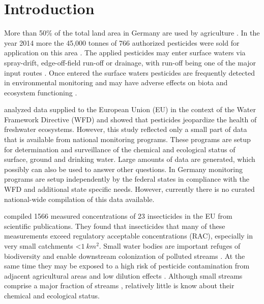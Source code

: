 \documentclass[journal=esthag,manuscript=article]{achemso}
\begin{document}
\section{Introduction}

More than 50\% of the total land area in Germany are used by agriculture \citep{statistisches_bundesamt_bodenflache_2014}.
In the year 2014 more the 45,000 tonnes of 766 authorized pesticides were sold for application on this area \citep{bundesamt_fur_verbraucherschutz_und_lebensmittelsicherheit_absatz_2015}.
The applied pesticides may enter surface waters via spray-drift, edge-off-field run-off or drainage, with run-off being one of the major input routes \citep{schulz_comparison_2001,liess_determination_1999}.
Once entered the surface waters pesticides are frequently detected in environmental monitoring \citep{malaj_organic_2014} and may have adverse effects on biota and ecosystem functioning \citep{schulz_field_2004, schafer_effects_2007}.

\citet{malaj_organic_2014} analyzed data supplied to the European Union (EU) in the context of the Water Framework Directive (WFD) and showed that pesticides jeopardize the health of freshwater ecosystems.
However, this study reflected only a small part of data that is available from national monitoring programs.
These programs are setup for determination and surveillance of the chemical and ecological status of surface, ground and drinking water.
Large amounts of data are generated, which possibly can also be used to answer other questions.
In Germany monitoring programs are setup independently by the federal states in compliance with the WFD \citep{quevauviller_water_2008} and additional state specific needs.
However, currently there is no curated national-wide compilation of this data available.

\citet{stehle_pesticide_2015} compiled 1566 measured concentrations of 23 insecticides in the EU from scientific publications. 
They found that insecticides that many of these measurements exceed regulatory acceptable concentrations (RAC), especially in very small catchments \textless $1~km^2$.
Small water bodies are important refuges of biodiversity \citep{davies_comparison_2008} and enable downstream colonization of polluted streams \citep{liess_analyzing_2005}.
At the same time they may be exposed to a high risk of pesticide contamination from adjacent agricultural areas and low dilution effects \citep{liess_determination_1999}.
Although small streams comprise a major fraction of streams \citep{nadeau_hydrological_2007}, relatively little is know about their chemical and ecological status.
\end{document}
